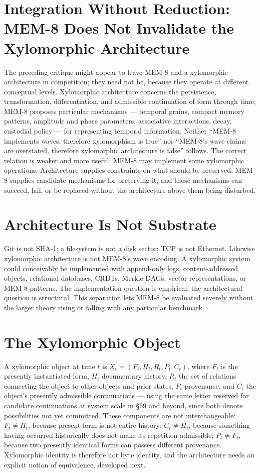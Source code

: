 \documentclass[12pt]{article}
\begin{document}
\section{Integration Without Reduction: MEM-8 Does Not Invalidate the Xylomorphic Architecture}

The preceding critique might appear to leave MEM-8 and a xylomorphic architecture in competition; they need not be, because they operate at different conceptual levels. Xylomorphic architecture concerns the persistence, transformation, differentiation, and admissible continuation of form through time; MEM-8 proposes particular mechanisms — temporal grains, compact memory patterns, amplitude and phase parameters, associative interactions, decay, custodial policy — for representing temporal information. Neither ``MEM-8 implements waves, therefore xylomorphism is true'' nor ``MEM-8's wave claims are overstated, therefore xylomorphic architecture is false'' follows. The correct relation is weaker and more useful: MEM-8 may implement some xylomorphic operations. Architecture supplies constraints on what should be preserved; MEM-8 supplies candidate mechanisms for preserving it, and those mechanisms can succeed, fail, or be replaced without the architecture above them being disturbed.

\section{Architecture Is Not Substrate}

Git is not SHA-1; a filesystem is not a disk sector; TCP is not Ethernet. Likewise xylomorphic architecture is not MEM-8's wave encoding. A xylomorphic system could conceivably be implemented with append-only logs, content-addressed objects, relational databases, CRDTs, Merkle DAGs, vector representations, or MEM-8 patterns. The implementation question is empirical; the architectural question is structural. This separation lets MEM-8 be evaluated severely without the larger theory rising or falling with any particular benchmark.

\section{The Xylomorphic Object}

A xylomorphic object at time $t$ is $X_t=(F_t,H_t,R_t,P_t,C_t)$, where $F_t$ is the presently instantiated form, $H_t$ documentary history, $R_t$ the set of relations connecting the object to other objects and prior states, $P_t$ provenance, and $C_t$ the object's presently admissible continuations — using the same letter reserved for candidate continuations at system scale in \S69 and beyond, since both denote possibilities not yet committed. These components are not interchangeable: $F_t\neq H_t$, because present form is not entire history; $C_t\neq H_t$, because something having occurred historically does not make its repetition admissible; $P_t\neq F_t$, because two presently identical forms can possess different provenance. Xylomorphic identity is therefore not byte identity, and the architecture needs an explicit notion of equivalence, developed next.
\end{document}
